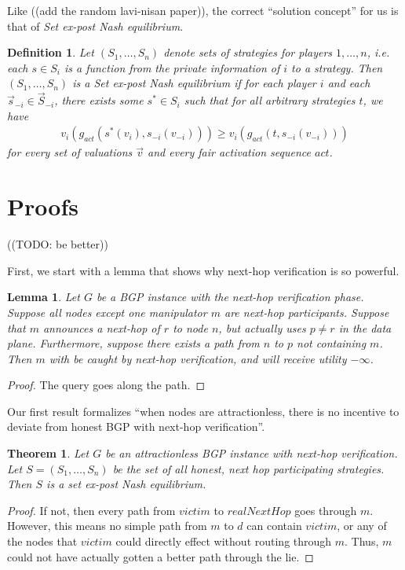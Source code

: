 \documentclass[12pt]{article}
\newtheorem{definition}{Definition}
\newtheorem{lemma}{Lemma}
\newtheorem{theorem}{Theorem}
\begin{document}
  Like \cite{Attraction} ((add the random lavi-nisan paper)),
  the correct ``solution concept'' for us is that of \emph{Set ex-post
  Nash equilibrium}.
  \begin{definition}
    Let $(S_1, \ldots, S_n)$ denote sets of strategies for players $1,\ldots,n$,
    i.e. each $s\in S_i$ is a function from the private information of $i$
    to a strategy.
    Then $(S_1, \ldots, S_n)$ is a \emph{Set ex-post Nash equilibrium} if
    for each player $i$ and each $\vec s _{-i} \in \vec S_{-i}$,
    there exists some $s^* \in S_i$ such that
    for \emph{all arbitrary strategies} $t$, we have
    \begin{align*}
      v_i( g_{act}( s^*(v_i), s_{-i}(v_{-i}) ) )
      \ge v_i( g_{act}( t, s_{-i}(v_{-i}) ) )
    \end{align*}
    for every set of valuations $\vec v$ and every fair activation sequence $act$.
  \end{definition}


\section{Proofs}
  ((TODO: be better))

  First, we start with a lemma that shows why next-hop verification is so
  powerful.
  \begin{lemma}
    Let $G$ be a BGP instance with the next-hop verification phase.
    Suppose all nodes except one manipulator $m$ are next-hop participants.
    Suppose that $m$ announces a next-hop of $r$ to node $n$,
    but actually uses $p\ne r$ in the data plane.
    Furthermore, suppose there exists a path from $n$ to $p$ not containing $m$.
    Then $m$ with be caught by next-hop verification, and will
    receive utility $-\infty$.
  \end{lemma}
  \begin{proof}
    The query goes along the path.
  \end{proof}

  Our first result formalizes ``when nodes are attractionless,
  there is no incentive to deviate from honest BGP with next-hop verification''.
  \begin{theorem}
    Let $G$ be an attractionless BGP instance with next-hop verification.
    Let $S = (S_1, \ldots, S_n)$ be the set of all honest, next hop participating
    strategies.
    Then $S$ is a set ex-post Nash equilibrium.
  \end{theorem}
  \begin{proof}
    If not, then every path from $victim$ to $realNextHop$ goes through $m$.
    However, this means no simple path from $m$ to $d$ can contain $victim$,
    or any of the nodes that $victim$ could directly effect without routing
    through $m$. Thus, $m$ could not have actually gotten a better path
    through the lie.
  \end{proof}
\end{document}
